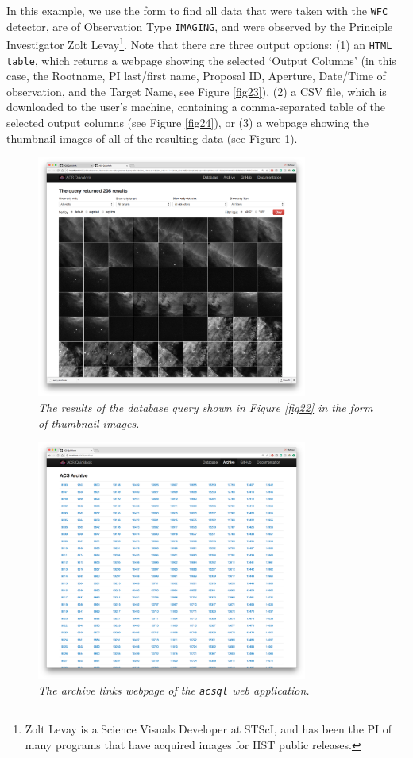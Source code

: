 \documentclass[10pt,journal,compsoc]{IEEEtran}
\begin{document}
In this example, we use the form to find all data that were taken with the \texttt{WFC} detector, are of Observation Type \texttt{IMAGING}, and were observed by the Principle Investigator
Zolt Levay\footnote{Zolt Levay is a Science Visuals Developer at STScI, and has been the PI of many programs that have acquired images for HST public releases.}.  Note that there are three
output options: (1) an \texttt{HTML table}, which returns a webpage showing the selected `Output Columns' (in this case, the Rootname, PI last/first name, Proposal ID, Aperture, Date/Time of
observation, and the Target Name, see Figure \ref{fig23}), (2) a CSV file, which is downloaded to the user's machine, containing a comma-separated table of the selected output columns
(see Figure \ref{fig24}), or (3) a webpage showing the thumbnail images of all of the resulting data (see Figure \ref{fig25}).

\begin{figure}[!t]
\centering
\includegraphics[width=3.5in]{./figures/database_query_results_thumbnails.png}
\caption{\textit{The results of the database query shown in Figure \ref{fig22} in the form of thumbnail images.}}
\label{fig25}
\end{figure}

\begin{figure}[!t]
\centering
\includegraphics[width=3.5in]{./figures/archive_links.png}
\caption{\textit{The archive links webpage of the \texttt{acsql} web application.}}
\label{fig26}
\end{figure}
\end{document}
